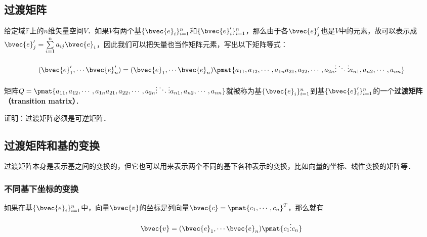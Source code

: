 
\subsection{过渡矩阵}
给定域$\mathbb{F}$上的$n$维矢量空间$V$．如果$V$有两个基$\{\bvec{e}_i\}_{i=1}^{n}$和$\{\bvec{e}'_i\}_{i=1}^{n}$，那么由于各$\bvec{e}'_j$也是$V$中的元素，故可以表示成$\bvec{e}'_j=\sum\limits_{i=1}^na_{ij}\bvec{e}_i$，因此我们可以把矢量也当作矩阵元素，写出以下矩阵等式：

\begin{equation}\label{TransM_eq1}
(\bvec{e}'_1, \cdots\bvec{e}'_n)=(\bvec{e}_1, \cdots\bvec{e}_n)\pmat{a_{11},a_{12},\cdots,a_{1n}\newline a_{21},a_{22},\cdots,a_{2n}\newline\vdots\ddots\vdots\newline a_{n1},a_{n2},\cdots,a_{nn}}
\end{equation}

矩阵$Q=\pmat{a_{11},a_{12},\cdots,a_{1n}\newline a_{21},a_{22},\cdots,a_{2n}\newline\vdots\ddots\vdots\newline a_{n1},a_{n2},\cdots,a_{nn}}$就被称为基$\{\bvec{e}_i\}_{i=1}^{n}$到基$\{\bvec{e}'_i\}_{i=1}^{n}$的一个\textbf{过渡矩阵（transition matrix）}．

\begin{example}{}
证明：过渡矩阵必须是可逆矩阵．
\end{example}

\subsection{过渡矩阵和基的变换}

过渡矩阵本身是表示基之间的变换的，但它也可以用来表示两个不同的基下各种表示的变换，比如向量的坐标、线性变换的矩阵等．

\subsubsection{不同基下坐标的变换}


如果在基$\{\bvec{e}_i\}_{i=1}^{n}$中，向量$\bvec{v}$的坐标是列向量$\bvec{c}=\pmat{c_1,\cdots, c_n}^T$，那么就有

\begin{equation}\label{TransM_eq2}
\bvec{v}=(\bvec{e}_1, \cdots\bvec{e}_n)\pmat{c_1\newline\vdots\newline c_n}
\end{equation}

